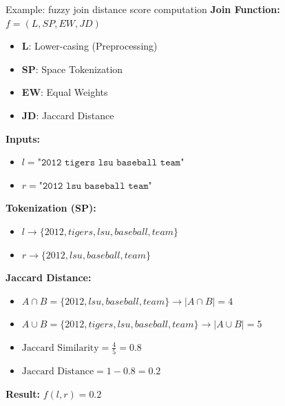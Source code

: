 \documentclass[8pt]{beamer} %
\begin{document}
\begin{frame}{Example: fuzzy join distance score computation}
	\textbf{Join Function:} $f = (L, SP, EW, JD)$
	\begin{itemize}
		\item \textbf{L}: Lower-casing (Preprocessing)
		\item \textbf{SP}: Space Tokenization
		\item \textbf{EW}: Equal Weights
		\item \textbf{JD}: Jaccard Distance
	\end{itemize}
	
	\vspace{1em}
	\textbf{Inputs:}
	\begin{itemize}
		\item $l = \texttt{"2012 tigers lsu baseball team"}$
		\item $r = \texttt{"2012 lsu baseball team"}$
	\end{itemize}
	
	\vspace{1em}
	\textbf{Tokenization (SP):}
	\begin{itemize}
		\item $l \rightarrow \{2012, tigers, lsu, baseball, team\}$
		\item $r \rightarrow \{2012, lsu, baseball, team\}$
	\end{itemize}
	
	\vspace{1em}
	\textbf{Jaccard Distance:}
	\begin{itemize}
		\item $A \cap B = \{2012, lsu, baseball, team\} \rightarrow |A \cap B| = 4$
		\item $A \cup B = \{2012, tigers, lsu, baseball, team\} \rightarrow |A \cup B| = 5$
		\item $\text{Jaccard Similarity} = \frac{4}{5} = 0.8$
		\item $\text{Jaccard Distance} = 1 - 0.8 = 0.2$
	\end{itemize}
	
	\vspace{1em}
	\textbf{Result:} $f(l, r) = 0.2$
\end{frame}
\end{document}
